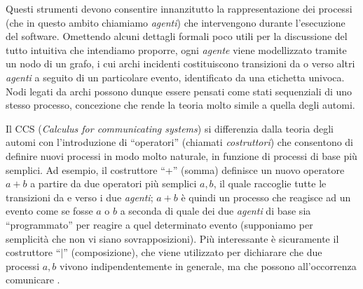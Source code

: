 Questi strumenti devono consentire innanzitutto la rappresentazione dei processi (che in questo ambito chiamiamo \emph{agenti}) che intervengono durante l'esecuzione del software. Omettendo alcuni dettagli formali poco utili per la discussione del tutto intuitiva che intendiamo proporre, ogni \emph{agente} viene modellizzato tramite un nodo di un grafo, i cui archi incidenti costituiscono transizioni da o verso altri \emph{agenti} a seguito di un particolare evento, identificato da una etichetta univoca. Nodi legati da archi possono dunque essere pensati come stati sequenziali di uno stesso processo, concezione che rende la teoria molto simile a quella degli automi.

Il CCS (\emph{Calculus for communicating systems}) si differenzia dalla teoria degli automi con l'introduzione di ``operatori'' (chiamati \emph{costruttori}) che consentono di definire nuovi processi in modo molto naturale, in funzione di processi di base più semplici. Ad esempio, il costruttore ``+'' (somma) definisce un nuovo operatore $a + b$ a partire da due operatori più semplici $a,b$, il quale raccoglie tutte le transizioni da e verso i due \emph{agenti}; $a + b$ è quindi un processo che reagisce ad un evento come se fosse $a$ o $b$ a seconda di quale dei due \emph{agenti} di base sia ``programmato'' per reagire a quel determinato evento (supponiamo per semplicità che non vi siano sovrapposizioni). Più interessante è sicuramente il costruttore ``$\mid$'' (composizione), che viene utilizzato per dichiarare che due processi $a,b$ vivono indipendentemente in generale, ma che possono all'occorrenza comunicare \cite{intro_calculus}.


